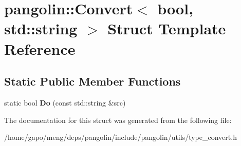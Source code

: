 \hypertarget{structpangolin_1_1_convert_3_01bool_00_01std_1_1string_01_4}{}\section{pangolin\+:\+:Convert$<$ bool, std\+:\+:string $>$ Struct Template Reference}
\label{structpangolin_1_1_convert_3_01bool_00_01std_1_1string_01_4}
\subsection*{Static Public Member Functions}
\begin{DoxyCompactItemize}
\item 
static bool {\bfseries Do} (const std\+::string \&src)\hypertarget{structpangolin_1_1_convert_3_01bool_00_01std_1_1string_01_4_aba02f14cc321725404c8585ba65ff94d}{}\label{structpangolin_1_1_convert_3_01bool_00_01std_1_1string_01_4_aba02f14cc321725404c8585ba65ff94d}

\end{DoxyCompactItemize}


The documentation for this struct was generated from the following file\+:\begin{DoxyCompactItemize}
\item 
/home/gapo/meng/deps/pangolin/include/pangolin/utils/type\+\_\+convert.\+h\end{DoxyCompactItemize}

